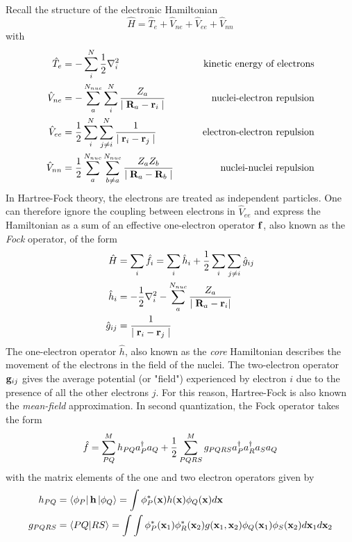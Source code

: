 Recall the structure of the electronic Hamiltonian
\begin{equation}
\hat{H} = \hat{T}_e + \hat{V}_{ne} + \hat{V}_{ee} + \hat{V}_{nn}
\end{equation}
\noindent with
\begin{alignat}{2}
\hat{T}_e &= -\sum_i^N \frac{1}{2} \nabla_i^2 & \qquad \textrm{kinetic energy of electrons} \\
\hat{V}_{ne} &= -\sum_a^{N_{nuc}} \sum_i^N \frac{Z_a}{\mid\mathbf{R}_a - \mathbf{r}_i\mid} & \qquad \textrm{nuclei-electron repulsion} \\
\hat{V}_{ee} &= \frac{1}{2} \sum^N_i \sum^N_{j \neq i} \frac{1}{\mid \mathbf{r}_i - \mathbf{r}_j\mid} & \qquad \textrm{electron-electron repulsion} \\
\hat{V}_{nn} &= \frac{1}{2}\sum_a^{N_{nuc}} \sum_{b \neq a}^{N_{nuc}} \frac{Z_a Z_b}{\mid \mathbf{R}_a - \mathbf{R}_b \mid} & \qquad \textrm{nuclei-nuclei repulsion} 
\end{alignat}
\noindent In Hartree-Fock theory, the electrons are treated as independent particles. One can therefore ignore the coupling between electrons in $\hat{V}_{ee}$ and express the Hamiltonian as a sum of an effective one-electron operator $\mathbf{f}$, also known as the \emph{Fock} operator, of the form
\begin{align}
\hat{H} &= \sum_i \hat{f}_i =  \sum_i \hat{h}_i + \frac{1}{2} \sum_i \sum_{j \neq i} \hat{g}_{ij} \\
\hat{h}_i &= -\frac{1}{2}\nabla_i^2 - \sum_a^{N_{nuc}} \frac{Z_a}{\mid \mathbf{R}_a - \mathbf{r}_i |} \\
\hat{g}_{ij} &= \frac{1}{\mid \mathbf{r}_i - \mathbf{r}_j \mid}
\end{align}
\noindent The one-electron operator $\hat{h}$, also known as the \emph{core} Hamiltonian describes the movement of the electrons in the field of the nuclei. The two-electron operator $\mathbf{g}_{ij}$ gives the average potential (or "field") experienced by electron $i$ due to the presence of all the other electrons $j$. For this reason, Hartree-Fock is also known the \emph{mean-field} approximation. In second quantization, the Fock operator takes the form
\begin{equation}
\hat{f} = \sum^{M}_{PQ} h_{PQ} a^{\dagger}_P a_Q + \frac{1}{2} \sum^{M}_{PQRS} g_{PQRS} a^{\dagger}_P a^{\dagger}_R a_S a_Q
\label{eq:FOCK2Q}
\end{equation}
\noindent with the matrix elements of the one and two electron operators given by
\begin{align}
h_{PQ} &= \bra{\phi_P} \mathbf{h} \ket{\phi_Q} = \int \phi_P^*(\mathbf{x}) h(\mathbf{x}) \phi_Q(\mathbf{x}) d\mathbf{x} \\
g_{PQRS} &= \bra{PQ}\ket{RS} = \int\int \phi_P^*(\mathbf{x}_1) \phi^*_R(\mathbf{x}_2) g(\mathbf{x}_1,\mathbf{x}_2) \phi_Q(\mathbf{x}_1) \phi_S(\mathbf{x}_2) d\mathbf{x}_1 d\mathbf{x}_2
\end{align} 
